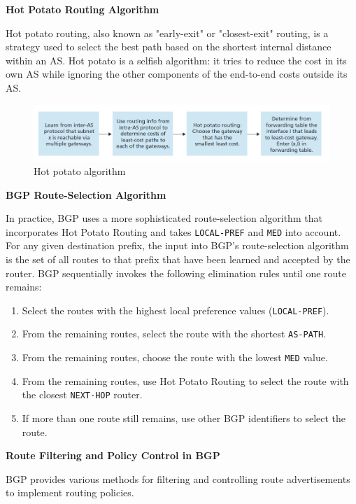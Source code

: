 \noindent\textbf{Hot Potato Routing Algorithm}\mbox{}

\noindent Hot potato routing, also known as "early-exit" or "closest-exit" routing, is a strategy used to select the best path based on the shortest internal distance within an AS. Hot potato is a selfish algorithm: it tries to reduce the cost in its own AS while ignoring the other components of the end-to-end costs outside its AS.

\begin{figure}[H]
    \centering
    \includegraphics[width = 0.85\linewidth]{img/4/control-plane/BGP/hot-potato.png}
    \caption{Hot potato algorithm \cite{Kurose2017}}
    \label{fig:Hot-potato}
\end{figure}

\noindent\textbf{BGP Route-Selection Algorithm}\mbox{}

\noindent In practice, BGP uses a more sophisticated route-selection algorithm that incorporates Hot Potato Routing and takes \texttt{LOCAL-PREF} and \texttt{MED} into account. For any given destination prefix, the input into BGP's route-selection algorithm is the set of all routes to that prefix that have been learned and accepted by the router. BGP sequentially invokes the following elimination rules until one route remains:

\begin{enumerate}
    \item Select the routes with the highest local preference values (\texttt{LOCAL-PREF}).
    \item From the remaining routes, select the route with the shortest \texttt{AS-PATH}.
    \item From the remaining routes, choose the route with the lowest \texttt{MED} value.
    \item From the remaining routes, use Hot Potato Routing to select the route with the closest \texttt{NEXT-HOP} router.
    \item If more than one route still remains, use other BGP identifiers to select the route.
\end{enumerate}

\noindent\textbf{Route Filtering and Policy Control in BGP}\mbox{}

\noindent BGP provides various methods for filtering and controlling route advertisements to implement routing policies.

